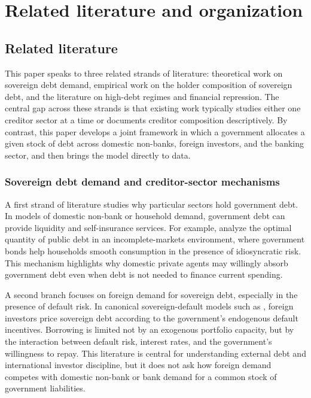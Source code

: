 \documentclass[\latexroot/\projectname]{subfiles}
\begin{document}
\section{Related literature and organization}
\whenintegrated{\label{sec:literature}}

\whenintegrated{\label{related-literature}}\par\subsection{Related literature}
\whenintegrated{\label{sec:relatedlit}} %

This paper speaks to three related strands of literature: theoretical work on sovereign debt demand, empirical work on the holder composition of sovereign debt, and the literature on high-debt regimes and financial repression.
The central gap across these strands is that existing work typically studies either one creditor sector at a time or documents creditor composition descriptively.
By contrast, this paper develops a joint framework in which a government allocates a given stock of debt across domestic non-banks, foreign investors, and the banking sector, and then brings the model directly to data.

\subsubsection{Sovereign debt demand and creditor-sector mechanisms}
\whenintegrated{\label{lit-sovereign-demand}}

A first strand of literature studies why particular sectors hold government debt.
In models of domestic non-bank or household demand, government debt can provide liquidity and self-insurance services.
For example, \citet{AiyagariMcGrattan1998} analyze the optimal quantity of public debt in an incomplete-markets environment, where government bonds help households smooth consumption in the presence of idiosyncratic risk.
This mechanism highlights why domestic private agents may willingly absorb government debt even when debt is not needed to finance current spending.

A second branch focuses on foreign demand for sovereign debt, especially in the presence of default risk.
In canonical sovereign-default models such as \citet{Arellano2008}, foreign investors price sovereign debt according to the government's endogenous default incentives.
Borrowing is limited not by an exogenous portfolio capacity, but by the interaction between default risk, interest rates, and the government's willingness to repay.
This literature is central for understanding external debt and international investor discipline, but it does not ask how foreign demand competes with domestic non-bank or bank demand for a common stock of government liabilities.
\end{document}

